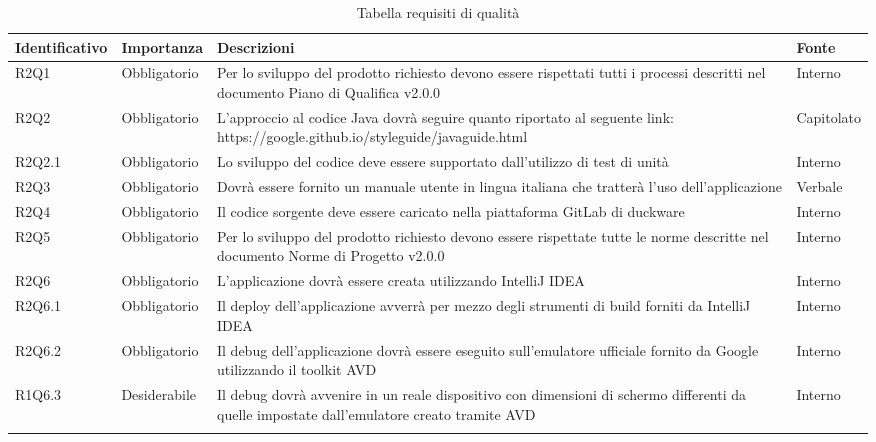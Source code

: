\begin{center}
	\renewcommand{\arraystretch}{1.5}
	\begin{longtable}{  >{\RaggedRight}p{2.5cm}  
						>{\RaggedRight}p{2.1cm} 
						>{\RaggedRight}p{7cm}  
						>{\RaggedRight}p{1.7cm} 
						}
		\rowcolor{tableHeadYellow}

		\textbf{Identificativo}   & \textbf{Importanza} & \textbf{Descrizioni} & \textbf{Fonte} \\ 
		\endhead

		R2Q1   & Obbligatorio & Per lo sviluppo del prodotto richiesto devono essere rispettati tutti i processi descritti nel documento Piano di Qualifica v2.0.0 & Interno    \\
		R2Q2   & Obbligatorio & L'approccio al codice Java dovrà seguire quanto riportato al seguente link: https://google.github.io/styleguide/javaguide.html                & Capitolato \\
		R2Q2.1 & Obbligatorio & Lo sviluppo del codice deve essere supportato dall'utilizzo di test di unità                                                        & Interno    \\  
		R2Q3   & Obbligatorio & Dovrà essere fornito un manuale utente in lingua italiana che tratterà l'uso dell'applicazione                                      & Verbale    \\  
		R2Q4   & Obbligatorio & Il codice sorgente deve essere caricato nella piattaforma GitLab di duckware                                                        & Interno    \\  
		R2Q5   & Obbligatorio & Per lo sviluppo del prodotto richiesto devono essere rispettate tutte le norme descritte nel documento Norme di Progetto v2.0.0 & Interno    \\  
		R2Q6   & Obbligatorio & L'applicazione dovrà essere creata utilizzando IntelliJ IDEA                                                                               & Interno               \\  
		R2Q6.1 & Obbligatorio & Il deploy dell'applicazione avverrà per mezzo degli strumenti di build forniti da IntelliJ IDEA                                            & Interno               \\  
		R2Q6.2 & Obbligatorio & Il debug dell'applicazione dovrà essere eseguito sull'emulatore ufficiale fornito da Google utilizzando il toolkit AVD                        & Interno               \\  
		R1Q6.3 & Desiderabile & Il debug dovrà avvenire in un reale dispositivo con dimensioni di schermo differenti da quelle impostate dall'emulatore creato tramite AVD & Interno               \\

		\rowcolor{white}
		\caption{Tabella requisiti di qualità}
	\end{longtable}
\end{center}
\clearpage
